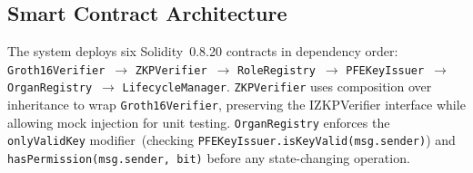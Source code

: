 \documentclass[10pt,twocolumn,a4paper]{article}
\begin{document}
\subsection{Smart Contract Architecture}

The system deploys six Solidity~0.8.20 contracts in dependency order:
\texttt{Groth16Verifier}~$\to$ \texttt{ZKPVerifier}~$\to$ \texttt{RoleRegistry}~$\to$
\texttt{PFEKeyIssuer}~$\to$ \texttt{OrganRegistry}~$\to$ \texttt{LifecycleManager}.
\texttt{ZKPVerifier} uses composition over inheritance to wrap
\texttt{Groth16Verifier}, preserving the IZKPVerifier interface while allowing
mock injection for unit testing. \texttt{OrganRegistry} enforces the
\texttt{onlyValidKey} modifier~(checking \texttt{PFEKeyIssuer.isKeyValid(msg.sender)})
and \texttt{hasPermission(msg.sender, bit)} before any state-changing operation.
\end{document}
